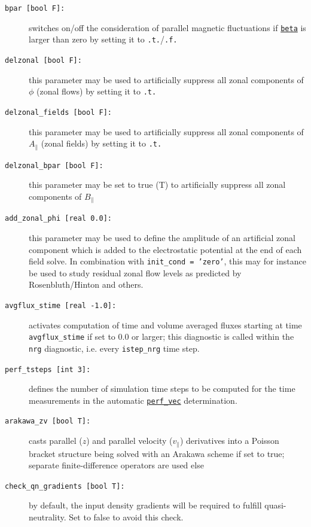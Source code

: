 \documentclass[12pt]{article}
\begin{document}
\begin{description}
\item[\hypertarget{bpar}{\tt bpar [bool F]:}] switches on/off the consideration of parallel magnetic fluctuations if
  \hyperlink{beta}{\tt beta} is larger than zero by setting it to \texttt{.t.}/\texttt{.f.}
\item[\texttt{delzonal [bool F]:}] this parameter may be used to
artificially suppress all zonal components of $\phi$ (zonal flows)
  by setting it to \texttt{.t.}
\item[\texttt{delzonal\_fields [bool F]:}] this parameter may be used to
artificially suppress all zonal components of $A_{\parallel}$ (zonal
fields) by setting it to \texttt{.t.}
\item[\texttt{delzonal\_bpar [bool F]:}] this parameter may be set to true (T) to
artificially suppress all zonal components of $B_{\parallel}$
\item[\texttt{add\_zonal\_phi [real 0.0]:}] this parameter may be used to define the amplitude
of an artificial zonal component which is added to the electrostatic potential at the end of each
field solve. In combination with {\tt init\_cond = 'zero'}, this may for instance be used to study
residual zonal flow levels as predicted by Rosenbluth/Hinton and others.
\item[\texttt{avgflux\_stime [real -1.0]:}] activates computation of time and volume averaged fluxes starting
at time \texttt{avgflux\_stime} if set to 0.0 or larger; this diagnostic is called within the \texttt{nrg}
diagnostic, i.e. every \texttt{istep\_nrg} time step.
\item[\texttt{perf\_tsteps [int 3]:}] defines the number of simulation time steps to be computed for the
time measurements in the automatic \hyperlink{perf_vec}{\tt perf\_vec} determination.
\item[\hypertarget{arakawa_zv}{\tt arakawa\_zv [bool T]:}] casts parallel ($z$) and parallel velocity ($v_\|$)
derivatives into a Poisson bracket structure being solved with an Arakawa scheme if set to true; separate
finite-difference operators are used else
\item[\hypertarget{check_qn_gradients}{\tt check\_qn\_gradients [bool T]:}] by default, the input density gradients will be required to fulfill quasi-neutrality. Set to false to avoid this check.
\end{description}
\end{document}
